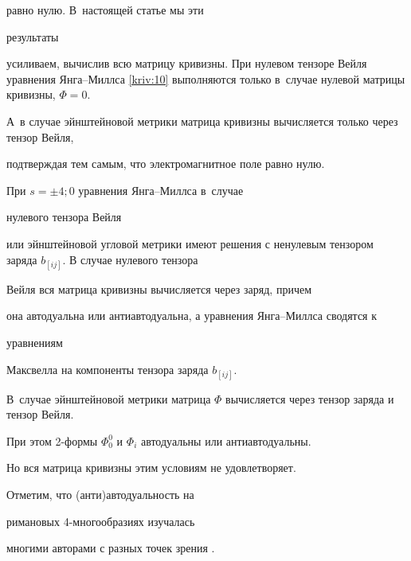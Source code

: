 равно нулю. В~настоящей статье мы эти 

результаты 

усиливаем,  вычислив всю  матрицу кривизны. При нулевом тензоре Вейля уравнения Янга--Миллса \eqref{kriv:10} выполняются только в~случае нулевой матрицы кривизны, $\Phi =0.$ 

А~в случае эйнштейновой метрики матрица кривизны вычисляется только через тензор Вейля, 

подтверждая тем самым,  что электромагнитное поле равно нулю.



При $s=\pm 4;0$ уравнения Янга--Миллса в~случае 

нулевого тензора Вейля 

или эйнштейновой угловой метрики имеют решения с ненулевым тензором заряда $b_{\left[ ij\right] }$. В случае нулевого тензора 

Вейля вся матрица кривизны вычисляется через заряд,  причем 

она автодуальна или антиавтодуальна,  а уравнения Янга--Миллса сводятся к 

уравнениям 

Максвелла на компоненты тензора заряда $b_{\left[ ij\right] }$. 

В~случае эйнштейновой метрики матрица $\Phi $ вычисляется через тензор заряда и тензор Вейля. 

При этом 2-формы $\Phi _{0}^{0}$ и $\Phi _{i}$ автодуальны или антиавтодуальны. 

Но вся матрица кривизны этим условиям не удовлетворяет.



Отметим, что (анти)автодуальность на 

римановых 4-многообразиях изучалась 

многими авторами с разных точек зрения \cite{bib:kriv:3, bib:kriv:4, bib:kriv:5}.





\smallskip




